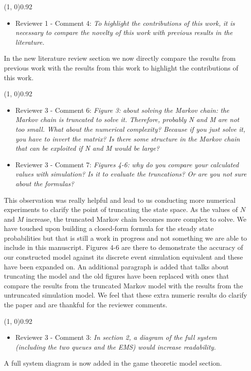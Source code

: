 \documentclass{article}
\begin{document}
    \line(1, 0){0.92\textwidth}
    \begin{itemize}
        \item Reviewer 1 - Comment 4: \textit{To highlight the contributions
        of this work, it is necessary to compare the novelty of this work
        with previous results in the literature.}
    \end{itemize}
    In the new literature review section we now directly compare the results
    from previous work with the results from this work to highlight the
    contributions of this work.

    \line(1, 0){0.92\textwidth}
    \begin{itemize}
        \item Reviewer 3 - Comment 6: \textit{Figure 3: about solving the
        Markov chain: the Markov chain is truncated to solve it. Therefore,
        probably N and M are not too small. What about the numerical
        complexity? Because if you just solve it, you have to invert the
        matrix? Is there some structure in the Markov chain that can be
        exploited if N and M would be large?}
        \item Reviewer 3 - Comment 7: \textit{Figures 4-6: why do you
        compare your calculated values with simulation?
        Is it to evaluate the truncations?
        Or are you not sure about the formulas?}
    \end{itemize}
    This observation was really helpful and lead to us conducting more numerical
    experiments to clarify the point of truncating the state space.
    As the values of \(N\) and \(M\) increase, the truncated Markov chain
    becomes more complex to solve.
    We have touched upon building a closed-form formula for the steady state
    probabilities but that is still a work in progress and not something we are
    able to include in this manuscript.
    Figures 4-6 are there to demonstrate the accuracy of our constructed
    model against its discrete event simulation equivalent and these have been
    expanded on.
    An additional paragraph is added that talks about truncating the model
    and the old figures have been replaced with ones that compare the
    results from the truncated Markov model with the results from the
    untruncated simulation model. We feel that these extra numeric results
    do clarify the paper and are thankful for the reviewer comments.

    \line(1, 0){0.92\textwidth}
    \begin{itemize}
        \item Reviewer 3 - Comment 3: \textit{In section 2, a diagram
        of the full system (including the two queues and the EMS) would
        increase readability.}
    \end{itemize}
    A full system diagram is now added in the game theoretic model section.
\end{document}
